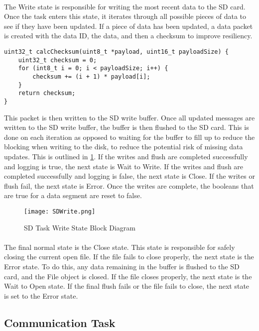 \paragraph{}
The Write state is responsible for writing the most recent data to the SD card.
Once the task enters this state, it iterates through all possible pieces of data to see if they have been updated.
If a piece of data has been updated, a data packet is created with the data ID, the data, and then a checksum to improve resiliency.
\begin{verbatim}
uint32_t calcChecksum(uint8_t *payload, uint16_t payloadSize) {
    uint32_t checksum = 0;
    for (int8_t i = 0; i < payloadSize; i++) {
        checksum += (i + 1) * payload[i];
    }
    return checksum;
}
\end{verbatim}
This packet is then written to the SD write buffer.
Once all updated messages are written to the SD write buffer, the buffer is then flushed to the SD card.
This is done on each iteration as opposed to waiting for the buffer to fill up to reduce the blocking when writing to the disk, to reduce the potential risk of missing data updates.
This is outlined in \cref{fig:SDWrite}.
If the writes and flush are completed successfully and logging is true, the next state is Wait to Write.
If the writes and flush are completed successfully and logging is false, the next state is Close.
If the writes or flush fail, the next state is Error.
Once the writes are complete, the booleans that are true for a data segment are reset to false.

\begin{figure}[H]
	\centering
	\texttt{[image: SDWrite.png]}
	\caption{SD Task Write State Block Diagram}
	\label{fig:SDWrite}
\end{figure}

\paragraph{}
The final normal state is the Close state.
This state is responsible for safely closing the current open file.
If the file fails to close properly, the next state is the Error state.
To do this, any data remaining in the buffer is flushed to the SD card, and the File object is closed.
If the file closes properly, the next state is the Wait to Open state.
If the final flush fails or the file fails to close, the next state is set to the Error state.

\subsection{Communication Task}

